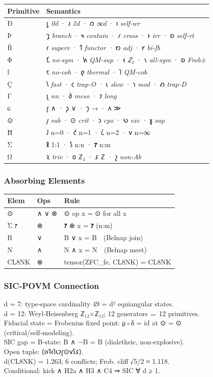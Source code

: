 \documentclass[12pt,a4paper]{article}
\begin{document}
\begin{longtable}[]{@{}ll@{}}
\toprule
Primitive & Semantics\tabularnewline
\midrule
\endhead
Ð & 𐑛 \emph{0d} · 𐑨 \emph{2d} · 𐑼 \emph{∞d} · 𐑦
\emph{self‑wr}\tabularnewline
Þ & 𐑡 \emph{branch} · 𐑰 \emph{contain} · 𐑥 \emph{cross} · 𐑶 \emph{irr} ·
𐑸 \emph{self‑rt}\tabularnewline
Ř & 𐑩 \emph{superv} · 𐑑 \emph{functor} · 𐑽 \emph{adj} · 𐑾
\emph{bi‑fb}\tabularnewline
Φ & 𐑗 \emph{no‑sym} · 𐑿 \emph{QM‑sup} · 𐑬 \emph{ℤ₂} · 𐑯 \emph{all‑sym} ·
𐑹 \emph{Frob±}\tabularnewline
ƒ & 𐑱 \emph{no‑coh} · 𐑞 \emph{thermal} · 𐑐 \emph{QM‑coh}\tabularnewline
Ç & 𐑘 \emph{fast} · 𐑤 \emph{trap‑O} · 𐑧 \emph{slow} · 𐑪 \emph{mod} · 𐑺
\emph{trap‑D}\tabularnewline
Γ & 𐑚 \emph{nn} · 𐑔 \emph{meso} · 𐑲 \emph{long}\tabularnewline
ɢ & 𐑝 ∧ · 𐑜 ∨ · 𐑠 → · 𐑵 ≫\tabularnewline
⊙ & 𐑢 \emph{sub} · ⊙ \emph{crit} · 𐑮 \emph{cpx} · 𐑻 \emph{exc} · 𐑣
\emph{sup}\tabularnewline
Ħ & 𐑓 n=0 · 𐑒 n=1 · 𐑖 n=2 · 𐑫 n=∞\tabularnewline
Σ & 𐑙 1:1 · 𐑕 n:n · \textbf{𐑳} n:m\tabularnewline
Ω & 𐑷 \emph{triv} · 𐑴 ℤ₂ · 𐑭 ℤ · 𐑟 \emph{non‑Ab}\tabularnewline
\bottomrule
\end{longtable}

\hypertarget{absorbing-elements}{%
\subsubsection{Absorbing Elements}\label{absorbing-elements}}

\begin{longtable}[]{@{}lll@{}}
\toprule
Elem & Ops & Rule\tabularnewline
\midrule
\endhead
⊙ & ∧ ∨ ⊗ & ⊙ op x = ⊙ for all x\tabularnewline
Σ 𐑳 & ⊗ & \textbf{𐑳} ⊗ x = \textbf{𐑳} (n:m)\tabularnewline
B & ∨ & B ∨ x = B (Belnap join)\tabularnewline
N & ∧ & N ∧ x = N (Belnap meet)\tabularnewline
CL8NK & ⊗ & tensor(ZFC\_fe, CL8NK) = CL8NK\tabularnewline
\bottomrule
\end{longtable}

\hypertarget{sicpovm-connection}{%
\subsubsection{SIC‑POVM Connection}\label{sicpovm-connection}}

d = 7: type‑space cardinality 49 = d² equiangular states.\\
d = 12: Weyl‑Heisenberg ℤ₁₂×ℤ₁₂; 12 generators ↔ 12 primitives.\\
Fiducial state = Frobenius fixed point: μ◦δ = id at ⊙ = ⊙
(critical/self‑modeling).\\
SIC gap = B‑state: B ∧ ¬B = B (dialetheic, non‑explosive).\\
Open tuple: ⟨𐑦𐑶𐑑𐑬𐑐𐑧𐑲𐑝⊙𐑫𐑕𐑭⟩.\\
d(CL8NK) = 1.263; 6 conflicts; Frob. cliff √5/2 ≈ 1.118.\\
Conditional: kick ∧ H2a ∧ H3 ∧ C4 ⇒ SIC ∀ d ≥ 1.
\end{document}
